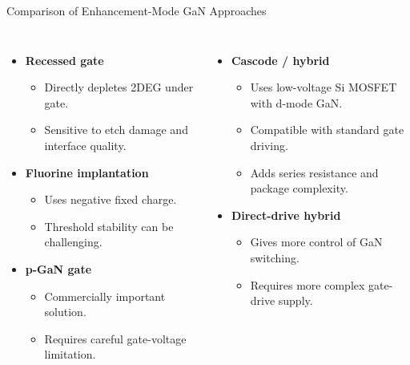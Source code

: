 \begin{frame}{Comparison of Enhancement-Mode GaN Approaches}
\begin{columns}
\begin{itemize}
    \item \textbf{Recessed gate}
    \begin{itemize}
        \item Directly depletes 2DEG under gate.
        \item Sensitive to etch damage and interface quality.
    \end{itemize}

    \item \textbf{Fluorine implantation}
    \begin{itemize}
        \item Uses negative fixed charge.
        \item Threshold stability can be challenging.
    \end{itemize}

    \item \textbf{p-GaN gate}
    \begin{itemize}
        \item Commercially important solution.
        \item Requires careful gate-voltage limitation.
    \end{itemize}
\end{itemize}

\begin{itemize}
    \item \textbf{Cascode / hybrid}
    \begin{itemize}
        \item Uses low-voltage Si MOSFET with d-mode GaN.
        \item Compatible with standard gate driving.
        \item Adds series resistance and package complexity.
    \end{itemize}

    \item \textbf{Direct-drive hybrid}
    \begin{itemize}
        \item Gives more control of GaN switching.
        \item Requires more complex gate-drive supply.
    \end{itemize}
\end{itemize}
\end{columns}
\end{frame}


